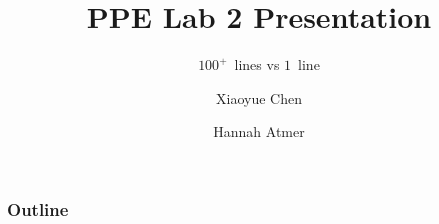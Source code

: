 \documentclass{beamer}
\title{PPE Lab 2 Presentation}
\subtitle{\(100^{+}\)~lines vs \(1\)~line}
\author{Xiaoyue Chen \and Hannah Atmer}
\begin{document}
\begin{frame}
  \titlepage
\end{frame}

\begin{frame}
  \frametitle{Outline}
  \tableofcontents
\end{frame}





\end{document}
